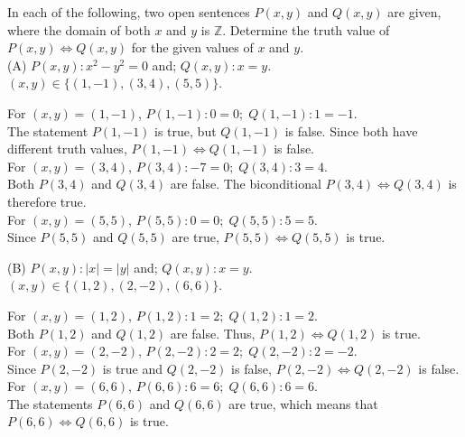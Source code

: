 \documentclass[12pt]{article}
\newcommand{\Z}{\mathbb{Z}}
\newenvironment{problem}[2][Problem]{\begin{trivlist}
		\item[\hskip \labelsep {\bfseries #1}\hskip \labelsep {\bfseries #2.}]}{\end{trivlist}}
\newenvironment{solution}[2][Solution]{\begin{trivlist}
		\item[\hskip \labelsep {\bfseries #1}\hskip \labelsep {\bfseries #2.}]}{\end{trivlist}}
\begin{document}
\begin{problem}{40}
	In each of the following, two open sentences $P(x,y)$ and $Q(x,y)$ are given, where the domain of both $x$ and $y$ is $\Z$. Determine the truth value of $P(x,y) \Leftrightarrow Q(x,y)$ for the given values of $x$ and $y$.\\
	
(A) $P(x,y):x^{2}-y^{2} = 0$ and; $Q(x,y): x=y.$\\
\indent $(x,y) \in \{(1,-1),(3,4),(5,5)\}$.
\begin{solution}{a}
	For $(x,y) = (1,-1)$, $P(1,-1): 0=0; \; Q(1,-1):1 = -1.$\\
	The statement $P(1,-1)$ is true, but $Q(1, -1)$ is false. Since both have different truth values, $P(1,-1) \Leftrightarrow Q(1,-1)$ is false.\\
	
	\noindent For $(x,y) = (3,4)$, $P(3,4): -7 = 0; \; Q(3,4) : 3 = 4.$\\
	Both $P(3,4)$ and $Q(3,4)$ are false. The biconditional $P(3,4) \Leftrightarrow Q(3,4)$ is therefore true.\\
	
	\noindent For $(x,y) = (5,5)$, $P(5,5): 0 = 0; \; Q(5,5): 5=5.$\\
	Since $P(5,5)$ and $Q(5,5)$ are true, $P(5,5) \Leftrightarrow Q(5,5)$ is true.\\ 
\end{solution}

(B) $P(x,y): \vert{x}\vert = \vert{y}\vert$ and; $Q(x,y): x = y$.\\
\indent $(x,y)\in \{(1,2),(2,-2),(6,6)\}$.
\begin{solution}{b}
	For $(x,y) = (1,2)$, $P(1,2) : 1 = 2; \; Q(1,2) : 1 = 2.$\\
	Both $P(1,2)$ and $Q(1,2)$ are false. Thus, $P(1,2) \Leftrightarrow Q(1,2)$ is true.\\
	
	\noindent For $(x,y) = (2,-2)$, $P(2,-2):2 = 2; \; Q(2,-2): 2 = -2.$\\
	Since $P(2,-2)$ is true and $Q(2,-2)$ is false, $P(2,-2) \Leftrightarrow Q(2,-2)$ is false.\\ 
	
	\noindent For $(x,y) = (6,6)$, $P(6,6) : 6 = 6; \; Q(6,6) : 6 = 6.$\\
	The statements $P(6,6)$ and $Q(6,6)$ are true, which means that $P(6,6) \Leftrightarrow Q(6,6)$ is true.\\
\end{solution}


\end{problem}
\end{document}
